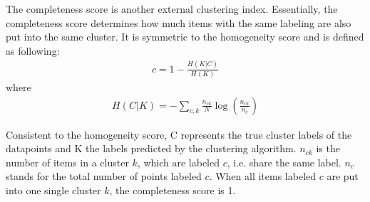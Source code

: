 The completeness score is another external clustering index. Essentially, the completeness score determines how much items with the same labeling are also put into the same cluster. It is symmetric to the homogeneity score and is defined as following: \cite{rosenberg2007v}
\begin{align}
    c = 1 - \frac{H(K|C)}{H(K)}  
\end{align}
where
\begin{align}
    H(C|K) = - \sum_{c,k} \frac{n_{ck}}{N}\log\left(\frac{n_{ck}}{n_c}\right)  
\end{align}


Consistent to the homogeneity score, C represents the true cluster labels of the datapoints and K the labels predicted by the clustering algorithm. $n_{ck}$ is the number of items in a cluster $k$, which are labeled $c$, i.e. share the same label. $n_c$ stands for the total number of points labeled $c$.
When all items labeled $c$ are put into one single cluster $k$, the completeness score is 1.